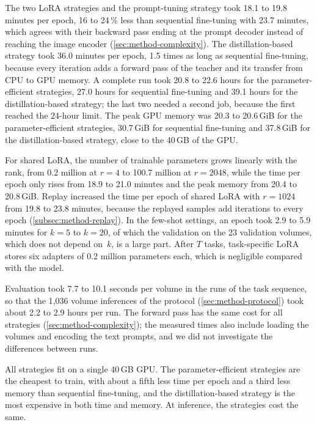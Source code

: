 The two LoRA strategies and the prompt-tuning strategy took 18.1 to 19.8 minutes per epoch, 16 to 24\,\% less than sequential fine-tuning with 23.7 minutes, which agrees with their backward pass ending at the prompt decoder instead of reaching the image encoder (\cref{sec:method-complexity}).
The distillation-based strategy took 36.0 minutes per epoch, 1.5 times as long as sequential fine-tuning, because every iteration adds a forward pass of the teacher and its transfer from CPU to GPU memory.
A complete run took 20.8 to 22.6 hours for the parameter-efficient strategies, 27.0 hours for sequential fine-tuning and 39.1 hours for the distillation-based strategy; the last two needed a second job, because the first reached the 24-hour limit.
The peak GPU memory was 20.3 to 20.6\,GiB for the parameter-efficient strategies, 30.7\,GiB for sequential fine-tuning and 37.8\,GiB for the distillation-based strategy, close to the 40\,GB of the GPU.

For shared LoRA, the number of trainable parameters grows linearly with the rank, from 0.2 million at $r = 4$ to 100.7 million at $r = 2048$, while the time per epoch only rises from 18.9 to 21.0 minutes and the peak memory from 20.4 to 20.8\,GiB.
Replay increased the time per epoch of shared LoRA with $r = 1024$ from 19.8 to 23.8 minutes, because the replayed samples add iterations to every epoch (\cref{subsec:method-replay}).
In the few-shot settings, an epoch took 2.9 to 5.9 minutes for $k = 5$ to $k = 20$, of which the validation on the 23 validation volumes, which does not depend on~$k$, is a large part.
After $T$ tasks, task-specific LoRA stores six adapters of 0.2 million parameters each, which is negligible compared with the model.

Evaluation took 7.7 to 10.1 seconds per volume in the runs of the task sequence, so that the 1{,}036 volume inferences of the protocol (\cref{sec:method-protocol}) took about 2.2 to 2.9 hours per run.
The forward pass has the same cost for all strategies (\cref{sec:method-complexity}); the measured times also include loading the volumes and encoding the text prompts, and we did not investigate the differences between runs.

All strategies fit on a single 40\,GB GPU.
The parameter-efficient strategies are the cheapest to train, with about a fifth less time per epoch and a third less memory than sequential fine-tuning, and the distillation-based strategy is the most expensive in both time and memory.
At inference, the strategies cost the same.
